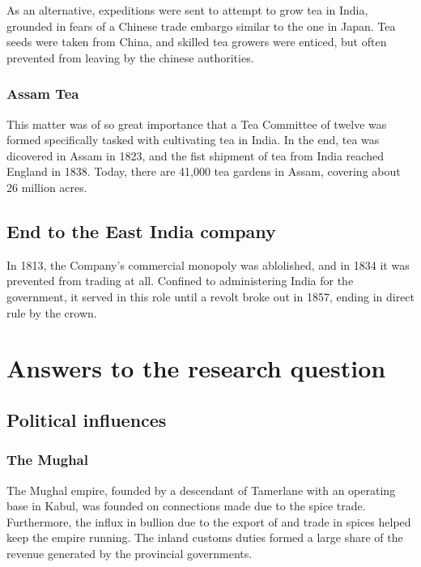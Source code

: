 \documentclass[11pt, a4paper, headings=standardclasses]{scrartcl}
\begin{document}
As an alternative, expeditions were sent to attempt to grow tea in India, grounded in fears of a Chinese trade embargo similar to the one in Japan.\autocite[211]{Tea} Tea seeds were taken from China, and skilled tea growers were enticed, but often prevented from leaving by the chinese authorities.\autocite[210]{Tea}

\subsubsection{Assam Tea}

This matter was of so great importance that a Tea Committee of twelve was formed specifically tasked with cultivating tea in India.\autocite[210]{Tea} In the end, tea was dicovered in Assam in 1823,\autocite[209]{Tea} and the fist shipment of tea from India reached England in 1838. Today, there are 41,000 tea gardens in Assam, covering about 26 million acres.\autocite{roy}

\subsection{End to the East India company}

In 1813, the Company's commercial monopoly was ablolished, and in 1834 it was prevented from trading at all. Confined to administering India for the government, it served in this role until a revolt broke out in 1857, ending in direct rule by the crown.\autocite{parliament}

\section{Answers to the research question}

\subsection{Political influences}
\subsubsection{The Mughal}

The Mughal empire, founded by a descendant of Tamerlane\autocite[6]{richards} with an operating base in Kabul, was founded on connections made due to the spice trade. Furthermore, the influx in bullion due to the export of and trade in spices helped keep the empire running. The inland customs duties formed a large share of the revenue generated by the provincial governments.\autocite[257]{RF}
\end{document}
